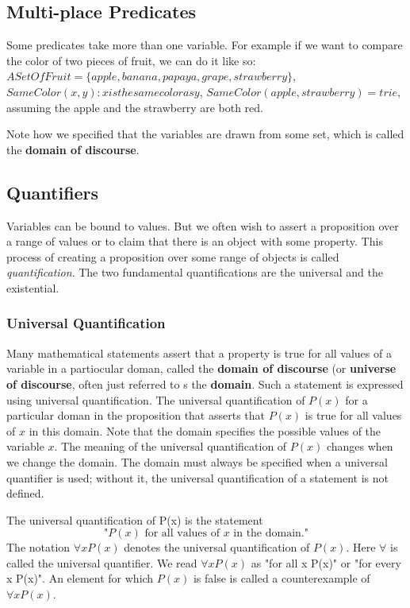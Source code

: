 \subsection{Multi-place Predicates}
Some predicates take more than one variable. For example if we want to compare the color of two pieces of fruit, we can do it like so: $ASetOfFruit=\{apple, banana, papaya, grape,strawberry\}$, $SameColor(x,y):x is the same color as y$, $SameColor(apple,strawberry)=trie$, assuming the apple and the strawberry are both red.

Note how we specified that the variables are drawn from some set, which is called the \textbf{domain of discourse}. 

   \subsection {Quantifiers}
Variables can be bound to values. But we often wish to assert a proposition over a range of values or to claim that there is an object with some property. This process of creating a proposition over some range of objects is called \textit{quantification}. The two fundamental quantifications are the universal and the existential.

        \subsubsection {Universal Quantification}
Many mathematical statements assert that a property is true for all values of a variable in a partiocular doman, called the \textbf{domain of discourse} (or \textbf{universe of discourse}, often just referred to s the \textbf{domain}. Such a statement is expressed using universal quantification. The universal quantification of $P(x)$ for a particular doman in the proposition that asserts that $P(x)$ is true for all values of $x$ in this domain. Note that the domain specifies the possible values of the variable $x$. The meaning of the universal quantification of $P(x)$ changes when we change the domain. The domain must always be specified when a universal quantifier is used; without it, the universal quantification of a statement is not defined.

\begin{definition}
The universal quantification of P(x) is the statement 
$$\text{"}P(x) \text{ for all values of }x \text{ in the domain."}$$
The notation $\forall x P(x)$ denotes the universal quantification of $P(x)$. Here $\forall$ is called the universal quantifier. We read $\forall x P(x)$ as "for all x P(x)" or "for every x P(x)". An element for which $P(x)$ is false is called a counterexample of $\forall x P(x)$.
\end{definition}

